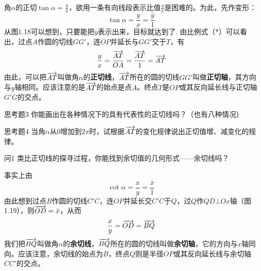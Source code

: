 角$\alpha$的正切$\tan\alpha=\frac{y}{x}$，欲用一条有向线段表示比值$\frac{y}{x}$是困难的。为此，先作变形：
\begin{equation}
    \tan\alpha=\frac{y}{x}=\frac{\bar y}{1} \tag{*}
\end{equation}
从图1.18可以想到，只要能把$\bar y$表示出来，目标就达到了. 由比例式（*）可以看出，过点$A$作圆的切线$GG'$，连$OP$并延长与$GG'$交于$T$，有
\[\dfrac{y}{x}=\dfrac{\overrightarrow{AT}}{OA}=\dfrac{\overrightarrow{AT}}{1}=\overrightarrow{AT}\]
由此，可以把$\overrightarrow{AT}$叫做角$\alpha$的\textbf{正切线}，$\overrightarrow{AT}$所在的圆的切线$GG'$叫做\textbf{正切轴}，其方向与$y$轴相同。应该注意的是$\overrightarrow{AT}$的始点是点$A$。终点$T$是$OP$或其反向延长线与正切轴$G'G$的交点。

\begin{figure}[htp]
    \centering
{}
    \caption{}
\end{figure}


\begin{thm}
    {思考题3} 你能画出在各种情况下的具有代表性的正切线吗？（也有八种情况）
\end{thm}


\begin{thm}
    {思考题4} 当角$\alpha$从0增加到$2\pi$时，试根据$\overrightarrow{AT}$的变化规律说出正切值增、减变化的规律。
\end{thm}

\begin{thm}
    {问1} 类比正切线的探寻过程，你能找到余切值的几何形式——余切线吗？
\end{thm}

事实上由
\[\cot\alpha=\frac{x}{y}=\frac{\bar x}{1}\]
由此想到过点$B$作圆的切线$C'C$，连$OP$并延长交$C'C$于$Q$，过$Q$作$QD\bot Ox$轴（图1.19），则$\overrightarrow{OD}=\bar x$，从而
\[\dfrac{x}{y}=\overrightarrow{OD}=\overrightarrow{BQ}\]
我们把$\overrightarrow{BQ}$叫做角$\alpha$的\textbf{余切线}，$\overrightarrow{BQ}$所在的圆的切线叫做\textbf{余切轴}，它的方向与$x$轴同向。应该注意，余切线的始点为$B$，终点$Q$则是半径$OP$或其反向延长线与余切轴$CC'$的交点。

